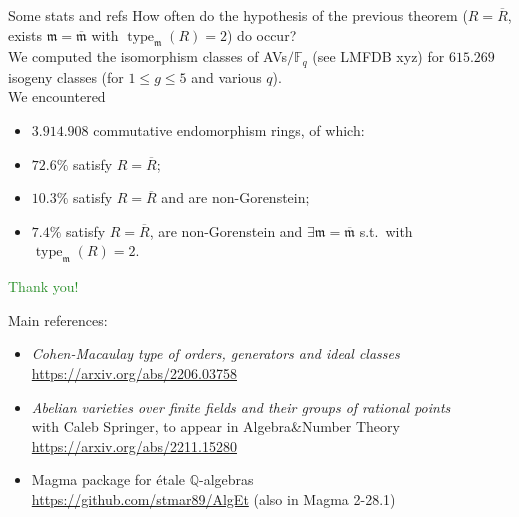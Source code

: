 \documentclass[usenames,dvipsnames]{beamer}
\def\Q{\mathbb{Q}}
\def\F{\mathbb{F}}
\DeclareMathOperator{\type}{type}
\renewcommand{\frm}{{\mathfrak m}}
\newcommand{\green}[1]{\textcolor{ForestGreen}{#1}}
\begin{document}
\begin{frame}{ Some stats and refs }
    How often do the hypothesis of the previous theorem ($R=\overline R$, exists $\frm =\overline \frm$ with $\type_\frm(R)=2$) do occur?\\

    We computed the isomorphism classes of AVs$/\F_q$ (see LMFDB xyz) for $615.269$ isogeny classes (for $1\leq g \leq 5$ and various $q$).\\
    We encountered
    \begin{itemize}
        \item $3.914.908$ commutative endomorphism rings, of which:
        \item \pause $72.6 \%$ satisfy $R=\overline{R}$;
        \item \pause $10.3 \%$ satisfy $R=\overline{R}$ and are non-Gorenstein;
        \item \pause $7.4 \%$ satisfy $R=\overline{R}$, are non-Gorenstein and $\exists \frm=\overline \frm$ s.t.~with $\type_\frm(R)=2$.
	\end{itemize}
\end{frame}

\begin{frame}{  }
    \begin{center}
    \green{\huge Thank you!}
    \end{center}
    \pause 
    {\footnotesize Main references:
    \begin{itemize}
        \item \emph{Cohen-Macaulay type of orders, generators and ideal classes}\\
            \url{https://arxiv.org/abs/2206.03758}
        \item \emph{Abelian varieties over finite fields and their groups of rational points}\\
            with Caleb Springer, to appear in Algebra\&Number Theory\\
            \url{https://arxiv.org/abs/2211.15280}
        \item Magma package for \'etale $\Q$-algebras\\
            \url{https://github.com/stmar89/AlgEt} 
            (also in Magma 2-28.1)
    \end{itemize}
    }
\end{frame}

	
\end{document}
